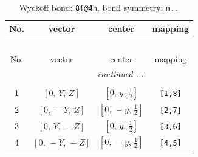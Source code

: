 \documentclass[fleqn,8pt]{jsarticle}
\begin{document}
\renewcommand{\arraystretch}{1.2}
\begin{longtable}{cccc}
\caption{Wyckoff bond: {\tt 8f@4h}, bond symmetry: {\tt m..}}
 \\
 \hline \hline
No. & vector & center & mapping \\ \hline \endfirsthead

\multicolumn{3}{l}{\tablename\ \thetable{}} \\
 \hline \hline
No. & vector & center & mapping \\ \hline \endhead

 \hline \hline
\multicolumn{3}{r}{\footnotesize\it continued ...} \\ \endfoot

 \hline \hline
\multicolumn{3}{r}{} \\ \endlastfoot

1 & $\left[ 0,\, Y,\, Z \right]$ & $\left[ 0,\, y,\, \frac{1}{2} \right]$ & {\tt [1,8]} \\ \hline
2 & $\left[ 0,\, - Y,\, Z \right]$ & $\left[ 0,\, - y,\, \frac{1}{2} \right]$ & {\tt [2,7]} \\ \hline
3 & $\left[ 0,\, Y,\, - Z \right]$ & $\left[ 0,\, y,\, \frac{1}{2} \right]$ & {\tt [3,6]} \\ \hline
4 & $\left[ 0,\, - Y,\, - Z \right]$ & $\left[ 0,\, - y,\, \frac{1}{2} \right]$ & {\tt [4,5]} \\
\end{longtable}
\renewcommand{\arraystretch}{1.2}
\end{document}
